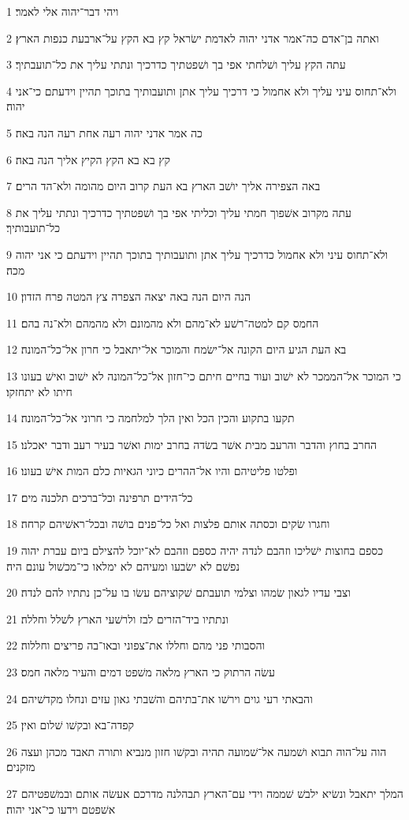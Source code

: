 \par 1 ויהי דבר־יהוה אלי לאמר׃
\par 2 ואתה בן־אדם כה־אמר אדני יהוה לאדמת ישׂראל קץ בא הקץ על־ארבעת כנפות הארץ׃
\par 3 עתה הקץ עליך ושׁלחתי אפי בך ושׁפטתיך כדרכיך ונתתי עליך את כל־תועבתיך׃
\par 4 ולא־תחוס עיני עליך ולא אחמול כי דרכיך עליך אתן ותועבותיך בתוכך תהיין וידעתם כי־אני יהוה׃
\par 5 כה אמר אדני יהוה רעה אחת רעה הנה באה׃
\par 6 קץ בא בא הקץ הקיץ אליך הנה באה׃
\par 7 באה הצפירה אליך יושׁב הארץ בא העת קרוב היום מהומה ולא־הד הרים׃
\par 8 עתה מקרוב אשׁפוך חמתי עליך וכליתי אפי בך ושׁפטתיך כדרכיך ונתתי עליך את כל־תועבותיך׃
\par 9 ולא־תחוס עיני ולא אחמול כדרכיך עליך אתן ותועבותיך בתוכך תהיין וידעתם כי אני יהוה מכה׃
\par 10 הנה היום הנה באה יצאה הצפרה צץ המטה פרח הזדון׃
\par 11 החמס קם למטה־רשׁע לא־מהם ולא מהמונם ולא מהמהם ולא־נה בהם׃
\par 12 בא העת הגיע היום הקונה אל־ישׂמח והמוכר אל־יתאבל כי חרון אל־כל־המונה׃
\par 13 כי המוכר אל־הממכר לא ישׁוב ועוד בחיים חיתם כי־חזון אל־כל־המונה לא ישׁוב ואישׁ בעונו חיתו לא יתחזקו׃
\par 14 תקעו בתקוע והכין הכל ואין הלך למלחמה כי חרוני אל־כל־המונה׃
\par 15 החרב בחוץ והדבר והרעב מבית אשׁר בשׂדה בחרב ימות ואשׁר בעיר רעב ודבר יאכלנו׃
\par 16 ופלטו פליטיהם והיו אל־ההרים כיוני הגאיות כלם המות אישׁ בעונו׃
\par 17 כל־הידים תרפינה וכל־ברכים תלכנה מים׃
\par 18 וחגרו שׂקים וכסתה אותם פלצות ואל כל־פנים בושׁה ובכל־ראשׁיהם קרחה׃
\par 19 כספם בחוצות ישׁליכו וזהבם לנדה יהיה כספם וזהבם לא־יוכל להצילם ביום עברת יהוה נפשׁם לא ישׂבעו ומעיהם לא ימלאו כי־מכשׁול עונם היה׃
\par 20 וצבי עדיו לגאון שׂמהו וצלמי תועבתם שׁקוציהם עשׂו בו על־כן נתתיו להם לנדה׃
\par 21 ונתתיו ביד־הזרים לבז ולרשׁעי הארץ לשׁלל וחללה׃
\par 22 והסבותי פני מהם וחללו את־צפוני ובאו־בה פריצים וחללוה׃
\par 23 עשׂה הרתוק כי הארץ מלאה משׁפט דמים והעיר מלאה חמס׃
\par 24 והבאתי רעי גוים וירשׁו את־בתיהם והשׁבתי גאון עזים ונחלו מקדשׁיהם׃
\par 25 קפדה־בא ובקשׁו שׁלום ואין׃
\par 26 הוה על־הוה תבוא ושׁמעה אל־שׁמועה תהיה ובקשׁו חזון מנביא ותורה תאבד מכהן ועצה מזקנים׃
\par 27 המלך יתאבל ונשׂיא ילבשׁ שׁממה וידי עם־הארץ תבהלנה מדרכם אעשׂה אותם ובמשׁפטיהם אשׁפטם וידעו כי־אני יהוה׃


